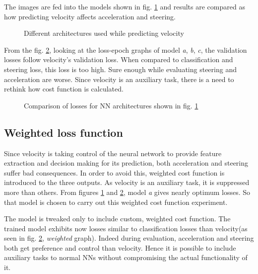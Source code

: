 The images are fed into the models shown in fig. \ref{fig:velocitycompareNN} and results are
compared as how predicting velocity affects acceleration and steering.
\begin{figure}[!ht]
    \centering
    \def\svgwidth{\textwidth}
    \caption{Different architectures used while predicting velocity}
    \label{fig:velocitycompareNN}
\end{figure}

From the fig. \ref{fig:velocitycompareloss1}, looking at the loss-epoch graphs of model
\textit{a}, \textit{b}, \textit{c}, the validation losses follow velocity's validation loss.
When compared to classification and steering loss, this loss is too high. Sure enough
while evaluating steering and acceleration are worse. Since velocity is an auxiliary task,
there is a need to rethink how cost function is calculated.
\begin{figure}[!ht]
	\centering
    \def\svgwidth{\textwidth}
    \caption{Comparison of losses for NN architectures shown in fig. \ref{fig:velocitycompareNN}}
    \label{fig:velocitycompareloss1}
\end{figure}

\subsection{Weighted loss function}
Since velocity is taking control of the neural network to provide feature extraction and
decision making for its prediction, both acceleration and steering suffer bad
consequences. In order to avoid this, weighted cost function is introduced to the three
outputs. As velocity is an auxiliary task, it is suppressed more than others. From figures
\ref{fig:velocitycompareNN} and \ref{fig:velocitycompareloss1}, model \textit{a} gives
nearly optimum losses. So that model is chosen to carry out this weighted cost function
experiment.

The model is tweaked only to include custom, weighted cost function. The trained model
exhibits now losses similar to classification losses than velocity(as seen in fig. \ref{fig:velocitycompareloss1}, \textit{weighted} graph). Indeed during
evaluation, acceleration and steering both get preference and control than velocity.
Hence it is possible to include auxiliary tasks to normal NNs without compromising the
actual functionality of it.
